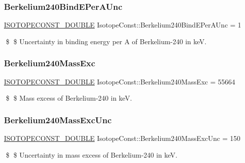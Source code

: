 \subsubsection{\texorpdfstring{Berkelium240\+Bind\+E\+Per\+A\+Unc}{Berkelium240BindEPerAUnc}}
{\footnotesize\ttfamily \mbox{\hyperlink{group___isotope_const-_macros_ga8f45a7272ce02c0b4c65c44636ed719a}{I\+S\+O\+T\+O\+P\+E\+C\+O\+N\+S\+T\+\_\+\+D\+O\+U\+B\+LE}} Isotope\+Const\+::\+Berkelium240\+Bind\+E\+Per\+A\+Unc = 1}

\$ \$ Uncertainty in binding energy per A of Berkelium-\/240 in keV. \mbox{\label{group___isotope_const-_berkelium-_bk240_ga10f959f049ac39a26137a968509c95cf}} 
\subsubsection{\texorpdfstring{Berkelium240\+Mass\+Exc}{Berkelium240MassExc}}
{\footnotesize\ttfamily \mbox{\hyperlink{group___isotope_const-_macros_ga8f45a7272ce02c0b4c65c44636ed719a}{I\+S\+O\+T\+O\+P\+E\+C\+O\+N\+S\+T\+\_\+\+D\+O\+U\+B\+LE}} Isotope\+Const\+::\+Berkelium240\+Mass\+Exc = 55664}

\$ \$ Mass excess of Berkelium-\/240 in keV. \mbox{\label{group___isotope_const-_berkelium-_bk240_ga25a38aeab47b07397bb0d9e61b7f96bf}} 
\subsubsection{\texorpdfstring{Berkelium240\+Mass\+Exc\+Unc}{Berkelium240MassExcUnc}}
{\footnotesize\ttfamily \mbox{\hyperlink{group___isotope_const-_macros_ga8f45a7272ce02c0b4c65c44636ed719a}{I\+S\+O\+T\+O\+P\+E\+C\+O\+N\+S\+T\+\_\+\+D\+O\+U\+B\+LE}} Isotope\+Const\+::\+Berkelium240\+Mass\+Exc\+Unc = 150}

\$ \$ Uncertainty in mass excess of Berkelium-\/240 in keV. \mbox{\label{group___isotope_const-_berkelium-_bk240_ga5291bff9553352a71296cd193cefe85d}} 
